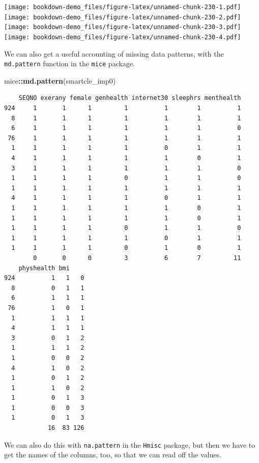 \documentclass[]{book}
\newenvironment{Shaded}{\begin{snugshade}}{\end{snugshade}}
\newcommand{\KeywordTok}[1]{\textcolor[rgb]{0.13,0.29,0.53}{\textbf{#1}}}
\newcommand{\OperatorTok}[1]{\textcolor[rgb]{0.81,0.36,0.00}{\textbf{#1}}}
\newcommand{\NormalTok}[1]{#1}
\theoremstyle{definition}
\theoremstyle{definition}
\theoremstyle{definition}
\theoremstyle{remark}
\begin{document}
\texttt{[image: bookdown-demo\_files/figure-latex/unnamed-chunk-230-1.pdf]}
\texttt{[image: bookdown-demo\_files/figure-latex/unnamed-chunk-230-2.pdf]}
\texttt{[image: bookdown-demo\_files/figure-latex/unnamed-chunk-230-3.pdf]}
\texttt{[image: bookdown-demo\_files/figure-latex/unnamed-chunk-230-4.pdf]}

We can also get a useful accounting of missing data patterns, with the
\texttt{md.pattern} function in the \texttt{mice} package.

\begin{Shaded}
\begin{Highlighting}[]
\NormalTok{mice}\OperatorTok{::}\KeywordTok{md.pattern}\NormalTok{(smartcle_imp0)}
\end{Highlighting}
\end{Shaded}

\begin{verbatim}
    SEQNO exerany female genhealth internet30 sleephrs menthealth
924     1       1      1         1          1        1          1
  8     1       1      1         1          1        1          1
  6     1       1      1         1          1        1          0
 76     1       1      1         1          1        1          1
  1     1       1      1         1          0        1          1
  4     1       1      1         1          1        0          1
  3     1       1      1         1          1        1          0
  1     1       1      1         0          1        1          0
  1     1       1      1         1          1        1          1
  4     1       1      1         1          0        1          1
  1     1       1      1         1          1        0          1
  1     1       1      1         1          1        0          1
  1     1       1      1         0          1        1          0
  1     1       1      1         1          0        1          1
  1     1       1      1         0          1        0          1
        0       0      0         3          6        7         11
    physhealth bmi    
924          1   1   0
  8          0   1   1
  6          1   1   1
 76          1   0   1
  1          1   1   1
  4          1   1   1
  3          0   1   2
  1          1   1   2
  1          0   0   2
  4          1   0   2
  1          0   1   2
  1          1   0   2
  1          0   1   3
  1          0   0   3
  1          0   1   3
            16  83 126
\end{verbatim}

We can also do this with \texttt{na.pattern} in the \texttt{Hmisc}
package, but then we have to get the names of the columns, too, so that
we can read off the values.
\end{document}
